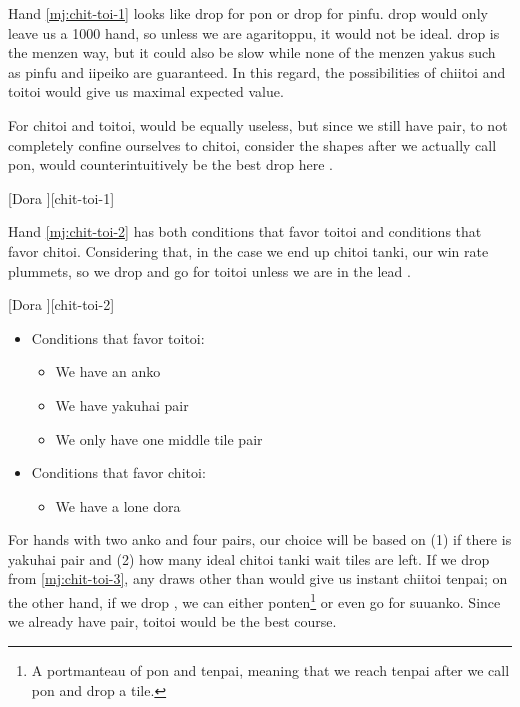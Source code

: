 \documentclass[12pt]{article}
\begin{document}
Hand \ref{mj:chit-toi-1} looks like  drop for  pon or  drop for pinfu.  drop would only leave us a 1000 hand, so unless we are agaritoppu, it would not be ideal.  drop is the menzen way, but it could also be slow while none of the menzen yakus such as pinfu and iipeiko are guaranteed. In this regard, the possibilities of chiitoi and toitoi would give us maximal expected value.

For chitoi and toitoi,  would be equally useless, but since we still have  pair, to not completely confine ourselves to chitoi, consider the shapes after we actually call  pon,  would counterintuitively be the best drop here \citep{gendai-toitoi}.

[Dora ][chit-toi-1]

Hand \ref{mj:chit-toi-2} has both conditions that favor toitoi and conditions that favor chitoi. Considering that, in the case we end up chitoi tanki, our win rate plummets, so we drop  and go for toitoi unless we are in the lead \citep{gendai-toitoi}.

[Dora ][chit-toi-2]

\begin{itemize}
  \item Conditions that favor toitoi:
  \begin{itemize}
    \item We have an anko
    \item We have yakuhai pair 
    \item We only have one middle tile pair 
  \end{itemize}
  \item Conditions that favor chitoi:
  \begin{itemize}
    \item We have a lone dora
  \end{itemize}
\end{itemize}

For hands with two anko and four pairs, our choice will be based on (1) if there is yakuhai pair and (2) how many ideal chitoi tanki wait tiles are left. If we drop  from \ref{mj:chit-toi-3}, any draws other than  would give us instant chiitoi tenpai; on the other hand, if we drop , we can either ponten\footnote{A portmanteau of pon and tenpai, meaning that we reach tenpai after we call pon and drop a tile.} or even go for suuanko. Since we already have  pair, toitoi would be the best course.
\end{document}
